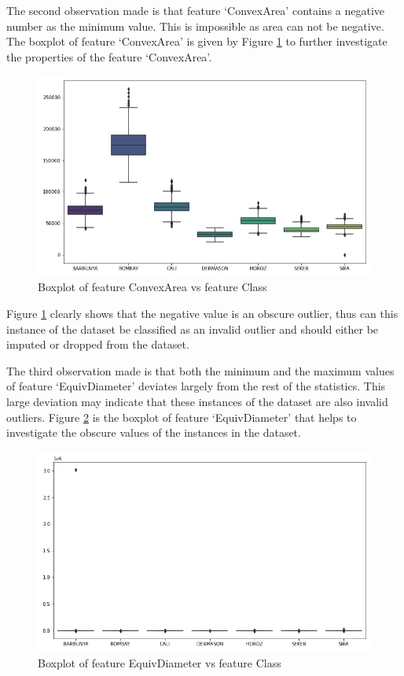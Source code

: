\documentclass[10pt, conference]{IEEEtran}
\begin{document}
The second observation made is that feature `ConvexArea' contains a negative number as the minimum value. This is
impossible as area can not be negative. The boxplot of feature `ConvexArea' is given by Figure
\ref{ConvexArea_boxplot_negative} to further investigate the properties of the feature `ConvexArea'.
\begin{figure}[h!]
    \centerline{\includegraphics[scale=0.35]{../Plots/Negative ConvexArea boxplot.png}}
    \caption{Boxplot of feature ConvexArea vs feature Class}
    \label{ConvexArea_boxplot_negative}
\end{figure}

Figure \ref{ConvexArea_boxplot_negative} clearly shows that the negative value is an obscure outlier, thus can this
instance of the dataset be classified as an invalid outlier and should either be imputed or dropped from the dataset.

The third observation made is that both the minimum and the maximum values of feature `EquivDiameter' deviates
largely from the rest of the statistics. This large deviation may indicate that these instances of the dataset
are also invalid outliers. Figure \ref{EquivDiameter boxplot before} is the boxplot of feature `EquivDiameter'
that helps to investigate the obscure values of the instances in the dataset.
\begin{figure}[H]
    \centerline{\includegraphics[scale=0.35]{../Plots/EquivDiameter outlier boxplot.png}}
    \caption{Boxplot of feature EquivDiameter vs feature Class}
    \label{EquivDiameter boxplot before}
\end{figure}
\end{document}
